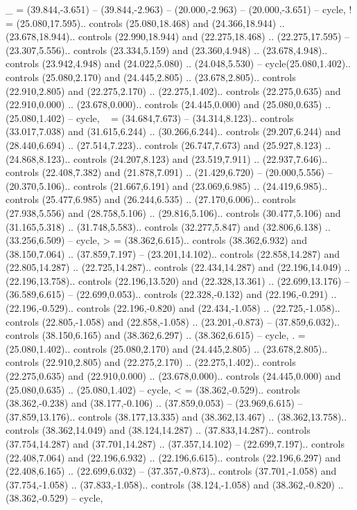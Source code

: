 {_} = {(39.844,-3.651) -- (39.844,-2.963) -- (20.000,-2.963) -- (20.000,-3.651) -- cycle},
{!} = {(25.080,17.595).. controls (25.080,18.468) and (24.366,18.944) .. (23.678,18.944).. controls (22.990,18.944) and (22.275,18.468) .. (22.275,17.595) -- (23.307,5.556).. controls (23.334,5.159) and (23.360,4.948) .. (23.678,4.948).. controls (23.942,4.948) and (24.022,5.080) .. (24.048,5.530) -- cycle(25.080,1.402).. controls (25.080,2.170) and (24.445,2.805) .. (23.678,2.805).. controls (22.910,2.805) and (22.275,2.170) .. (22.275,1.402).. controls (22.275,0.635) and (22.910,0.000) .. (23.678,0.000).. controls (24.445,0.000) and (25.080,0.635) .. (25.080,1.402) -- cycle},
{~} = {(34.684,7.673) -- (34.314,8.123).. controls (33.017,7.038) and (31.615,6.244) .. (30.266,6.244).. controls (29.207,6.244) and (28.440,6.694) .. (27.514,7.223).. controls (26.747,7.673) and (25.927,8.123) .. (24.868,8.123).. controls (24.207,8.123) and (23.519,7.911) .. (22.937,7.646).. controls (22.408,7.382) and (21.878,7.091) .. (21.429,6.720) -- (20.000,5.556) -- (20.370,5.106).. controls (21.667,6.191) and (23.069,6.985) .. (24.419,6.985).. controls (25.477,6.985) and (26.244,6.535) .. (27.170,6.006).. controls (27.938,5.556) and (28.758,5.106) .. (29.816,5.106).. controls (30.477,5.106) and (31.165,5.318) .. (31.748,5.583).. controls (32.277,5.847) and (32.806,6.138) .. (33.256,6.509) -- cycle},
{>} = {(38.362,6.615).. controls (38.362,6.932) and (38.150,7.064) .. (37.859,7.197) -- (23.201,14.102).. controls (22.858,14.287) and (22.805,14.287) .. (22.725,14.287).. controls (22.434,14.287) and (22.196,14.049) .. (22.196,13.758).. controls (22.196,13.520) and (22.328,13.361) .. (22.699,13.176) -- (36.589,6.615) -- (22.699,0.053).. controls (22.328,-0.132) and (22.196,-0.291) .. (22.196,-0.529).. controls (22.196,-0.820) and (22.434,-1.058) .. (22.725,-1.058).. controls (22.805,-1.058) and (22.858,-1.058) .. (23.201,-0.873) -- (37.859,6.032).. controls (38.150,6.165) and (38.362,6.297) .. (38.362,6.615) -- cycle},
{.} = {(25.080,1.402).. controls (25.080,2.170) and (24.445,2.805) .. (23.678,2.805).. controls (22.910,2.805) and (22.275,2.170) .. (22.275,1.402).. controls (22.275,0.635) and (22.910,0.000) .. (23.678,0.000).. controls (24.445,0.000) and (25.080,0.635) .. (25.080,1.402) -- cycle},
{<} = {(38.362,-0.529).. controls (38.362,-0.238) and (38.177,-0.106) .. (37.859,0.053) -- (23.969,6.615) -- (37.859,13.176).. controls (38.177,13.335) and (38.362,13.467) .. (38.362,13.758).. controls (38.362,14.049) and (38.124,14.287) .. (37.833,14.287).. controls (37.754,14.287) and (37.701,14.287) .. (37.357,14.102) -- (22.699,7.197).. controls (22.408,7.064) and (22.196,6.932) .. (22.196,6.615).. controls (22.196,6.297) and (22.408,6.165) .. (22.699,6.032) -- (37.357,-0.873).. controls (37.701,-1.058) and (37.754,-1.058) .. (37.833,-1.058).. controls (38.124,-1.058) and (38.362,-0.820) .. (38.362,-0.529) -- cycle},

